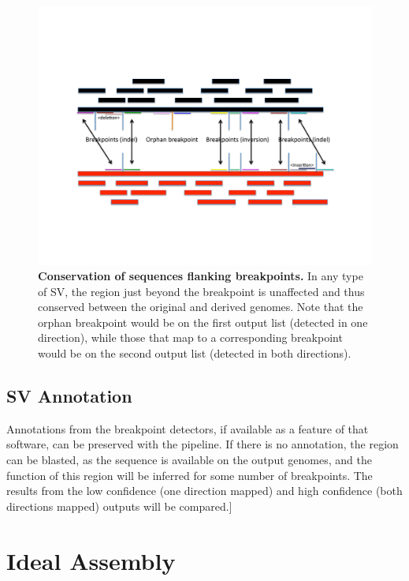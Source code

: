 \documentclass{easychithesis}
\begin{document}
\begin{figure}[!ht]
\begin{center}
\includegraphics[width = 0.95  \linewidth]{../Code/Figures/FlankConservation.pdf}
\end{center}
\caption{{\bf Conservation of sequences flanking breakpoints.} In any type of SV, the region just beyond the breakpoint is unaffected and thus conserved between the original and derived genomes. Note that the orphan breakpoint would be on the first output list (detected in one direction), while those that map to a corresponding breakpoint would be on the second output list (detected in both directions).}
\label{fig:FlankConservation}
\end{figure}

\subsection{SV Annotation}
Annotations from the breakpoint detectors, if available as a feature of that software, can be preserved with the pipeline. If there is no annotation, the region can be blasted, as the sequence is available on the output genomes, and the function of this region will be inferred for some number of breakpoints. The results from the low confidence (one direction mapped) and high confidence (both directions mapped) outputs will be compared.]

\section{Ideal Assembly}
\end{document}
